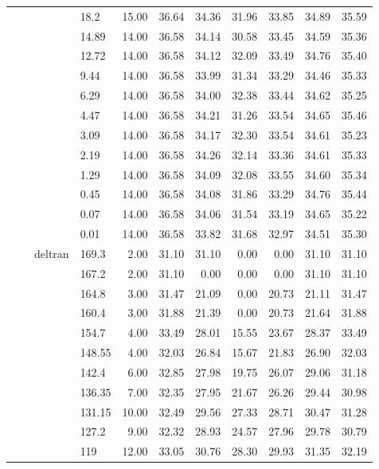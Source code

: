 \begin{longtable}{llllrrrrrrr}
   &  &  & 18.2 & 15.00 & 36.64 & 34.36 & 31.96 & 33.85 & 34.89 & 35.59 \\ 
   &  &  & 14.89 & 14.00 & 36.58 & 34.14 & 30.58 & 33.45 & 34.59 & 35.36 \\ 
   &  &  & 12.72 & 14.00 & 36.58 & 34.12 & 32.09 & 33.49 & 34.76 & 35.40 \\ 
   &  &  & 9.44 & 14.00 & 36.58 & 33.99 & 31.34 & 33.29 & 34.46 & 35.33 \\ 
   &  &  & 6.29 & 14.00 & 36.58 & 34.00 & 32.38 & 33.44 & 34.62 & 35.25 \\ 
   &  &  & 4.47 & 14.00 & 36.58 & 34.21 & 31.26 & 33.54 & 34.65 & 35.46 \\ 
   &  &  & 3.09 & 14.00 & 36.58 & 34.17 & 32.30 & 33.54 & 34.61 & 35.23 \\ 
   &  &  & 2.19 & 14.00 & 36.58 & 34.26 & 32.14 & 33.36 & 34.61 & 35.33 \\ 
   &  &  & 1.29 & 14.00 & 36.58 & 34.09 & 32.08 & 33.55 & 34.60 & 35.34 \\ 
   &  &  & 0.45 & 14.00 & 36.58 & 34.08 & 31.86 & 33.29 & 34.76 & 35.44 \\ 
   &  &  & 0.07 & 14.00 & 36.58 & 34.06 & 31.54 & 33.19 & 34.65 & 35.22 \\ 
   &  &  & 0.01 & 14.00 & 36.58 & 33.82 & 31.68 & 32.97 & 34.51 & 35.30 \\ 
   &  & deltran & 169.3 & 2.00 & 31.10 & 31.10 & 0.00 & 0.00 & 31.10 & 31.10 \\ 
   &  &  & 167.2 & 2.00 & 31.10 & 0.00 & 0.00 & 0.00 & 31.10 & 31.10 \\ 
   &  &  & 164.8 & 3.00 & 31.47 & 21.09 & 0.00 & 20.73 & 21.11 & 31.47 \\ 
   &  &  & 160.4 & 3.00 & 31.88 & 21.39 & 0.00 & 20.73 & 21.64 & 31.88 \\ 
   &  &  & 154.7 & 4.00 & 33.49 & 28.01 & 15.55 & 23.67 & 28.37 & 33.49 \\ 
   &  &  & 148.55 & 4.00 & 32.03 & 26.84 & 15.67 & 21.83 & 26.90 & 32.03 \\ 
   &  &  & 142.4 & 6.00 & 32.85 & 27.98 & 19.75 & 26.07 & 29.06 & 31.18 \\ 
   &  &  & 136.35 & 7.00 & 32.35 & 27.95 & 21.67 & 26.26 & 29.44 & 30.98 \\ 
   &  &  & 131.15 & 10.00 & 32.49 & 29.56 & 27.33 & 28.71 & 30.47 & 31.28 \\ 
   &  &  & 127.2 & 9.00 & 32.32 & 28.93 & 24.57 & 27.96 & 29.78 & 30.79 \\ 
   &  &  & 119 & 12.00 & 33.05 & 30.76 & 28.30 & 29.93 & 31.35 & 32.19 \\ 

\end{longtable}
